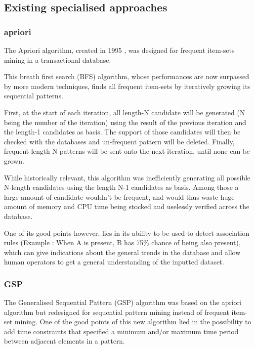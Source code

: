 \documentclass{eplmastersthesis}
\begin{document}
\subsection{Existing specialised approaches}

\subsubsection{apriori}

The Apriori algorithm, created in 1995 \cite{agrawal1995mining}, was designed for frequent item-sets mining in a transactional database.\newline

This breath first search (BFS) algorithm, whose performances are now surpassed by more modern techniques, finds all frequent item-sets by iteratively growing its sequential patterns. \newline

First, at the start of each iteration, all length-N candidate will be generated (N being the number of the iteration) using the result of the previous iteration and the length-1 candidates as basis. The support of those candidates will then be checked with the databases and un-frequent pattern will be deleted. Finally, frequent length-N patterns will be sent onto the next iteration, until none can be grown. \newline

While historically relevant, this algorithm was inefficiently generating all possible N-length candidates using the length N-1 candidates as basis. Among those a large amount of candidate wouldn't be frequent, and would thus waste huge amount of memory and CPU time being stocked and uselessly verified across the database. \newline

One of its good points however, lies in its ability to be used to detect association rules (Example : When A is present, B has 75\% chance of being also present), which can give indications about the general trends in the database and allow human operators to get a general understanding of the inputted dataset.

\subsubsection{GSP}

The Generalised Sequential Pattern (GSP) algorithm \cite{srikant1996mining} was based on the apriori algorithm but redesigned for sequential pattern mining instead of frequent item-set mining. One of the good points of this new algorithm lied in the possibility to add time constraints that specified a minimum and/or maximum time period between adjacent elements in a pattern. \newline
\end{document}
